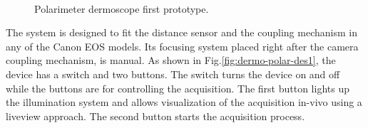 \begin{figure}
	\begin{center}
		\\
	\end{center}
	\caption[The first prototype of polariemeter dermoscope]{Polarimeter dermoscope first prototype.}
	\label{fig:dermo-polar-des}
\end{figure}

The system is designed to fit the distance sensor and the coupling mechanism in any of the Canon EOS models.
Its focusing system placed right after the camera coupling mechanism, is manual.
As shown in Fig.\ref{fig:dermo-polar-des1}, the device has a switch and two buttons. 
The switch turns the device on and off while the buttons are for controlling the acquisition.
The first button lights up the illumination system and allows visualization of the acquisition in-vivo using a liveview approach.
The second button starts the acquisition process.


